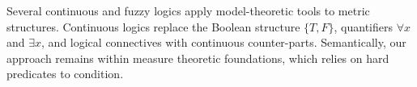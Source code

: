 Several continuous \cite{levin2000continuous} and fuzzy \cite{klir1995fuzzy} logics apply model-theoretic tools to metric structures.
Continuous logics replace the Boolean structure $\{T, F\}$, quantifiers $\forall x$ and $\exists x$, and logical connectives with continuous counter-parts.
Semantically, our approach remains within measure theoretic foundations, which relies on hard predicates to condition.



